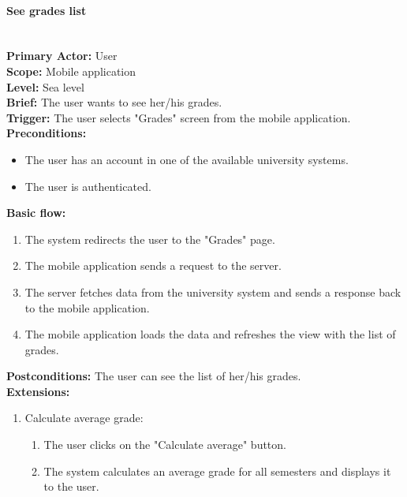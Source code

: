 \paragraph{\large{See grades list}}\mbox{}\\[2pt]
\textbf{Primary Actor:} User\\
\textbf{Scope:} Mobile application\\
\textbf{Level:} Sea level\\
\textbf{Brief:} The user wants to see her/his grades.\\
\textbf{Trigger:} The user selects "Grades" screen from the mobile application.\\
\textbf{Preconditions:}
\begin{itemize}
    \item The user has an account in one of the available university systems.
    \item The user is authenticated.
\end{itemize}
\textbf{Basic flow:}
\begin{enumerate}
    \item The system redirects the user to the "Grades" page.
    \item The mobile application sends a request to the server.
    \item The server fetches data from the university system and sends a response back to the mobile application.
    \item The mobile application loads the data and refreshes the view with the list of grades.
\end{enumerate}
\textbf{Postconditions:}
The user can see the list of her/his grades.\\
\textbf{Extensions:}
\begin{enumerate}[label=\alph*.]
    \item Calculate average grade:
    \begin{enumerate}
        \item The user clicks on the "Calculate average" button.
        \item The system calculates an average grade for all semesters and displays it to the user.
    \end{enumerate}
\end{enumerate}


